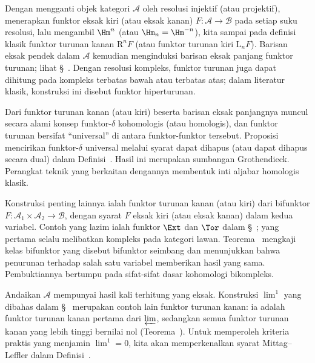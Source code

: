 Dengan mengganti objek kategori $\mathcal{A}$ oleh resolusi injektif (atau
projektif), menerapkan funktor eksak kiri (atau eksak kanan)
$F:\mathcal{A}\to\mathcal{B}$ pada setiap suku resolusi, lalu mengambil
$\Hm^n$ (atau $\Hm_n=\Hm^{-n}$), kita sampai pada definisi klasik funktor
turunan kanan $\mathrm{R}^nF$ (atau funktor turunan kiri $\mathrm{L}_nF$).
Barisan eksak pendek dalam $\mathcal{A}$ kemudian menginduksi barisan eksak
panjang funktor turunan; lihat
\S~. Dengan resolusi kompleks,
funktor turunan juga dapat dihitung pada kompleks terbatas bawah atau terbatas
atas; dalam literatur klasik, konstruksi ini disebut funktor hiperturunan.

Dari funktor turunan kanan (atau kiri) beserta barisan eksak panjangnya muncul
secara alami konsep funktor-$\delta$ kohomologis (atau homologis), dan funktor
turunan bersifat ``universal'' di antara funktor-funktor tersebut.
Proposisi~
mencirikan funktor-$\delta$ universal melalui syarat dapat dihapus (atau dapat
dihapus secara dual) dalam
Definisi~. Hasil ini merupakan
sumbangan Grothendieck. Perangkat teknik yang berkaitan dengannya membentuk
inti aljabar homologis klasik.

Konstruksi penting lainnya ialah funktor turunan kanan (atau kiri) dari
bifunktor $F:\mathcal{A}_1\times\mathcal{A}_2\to\mathcal{B}$, dengan syarat
$F$ eksak kiri (atau eksak kanan) dalam kedua variabel. Contoh yang lazim
ialah funktor $\Ext$ dan $\Tor$ dalam
\S~; yang pertama selalu melibatkan kompleks
pada kategori lawan. Teorema~ mengkaji kelas bifunktor yang disebut bifunktor seimbang dan
menunjukkan bahwa penurunan terhadap salah satu variabel memberikan hasil
yang sama. Pembuktiannya bertumpu pada sifat-sifat dasar kohomologi
bikompleks.

Andaikan $\mathcal{A}$ mempunyai hasil kali terhitung yang eksak.
Konstruksi $\lim^1$ yang dibahas dalam
\S~ merupakan contoh lain funktor turunan
kanan: ia adalah funktor turunan kanan pertama dari $\varprojlim$, sedangkan
semua funktor turunan kanan yang lebih tinggi bernilai nol
(Teorema~). Untuk memperoleh kriteria
praktis yang menjamin $\lim^1=0$, kita akan memperkenalkan syarat
Mittag--Leffler dalam Definisi~.

